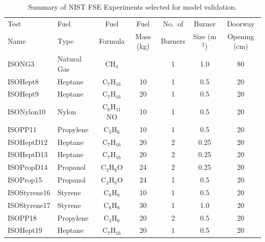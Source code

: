 \begin{table}[!ht]
\centering
\caption[Summary of NIST FSE Experiments selected for model validation]{Summary of NIST FSE Experiments selected for model validation.}
\begin{tabular}{|l|l|c|c|c|c|c|}
\hline
Test          &  Fuel         &  Fuel             &  Fuel      &  No.~of   &  Burner       &  Doorway          \\
Name          &  Type         &  Formula          &  Mass (kg) &  Burners  &  Size (m$^2$) &  Opening (cm)     \\ \hline \hline
ISONG3        &  Natural Gas  &  CH$_4$           &            &  1        &  1.0          &  80               \\ \hline
ISOHept8      &  Heptane      &  C$_7$H$_{16}$    &  10        &  1        &  0.5          &  20               \\ \hline
ISOHept9      &  Heptane      &  C$_7$H$_{16}$    &  20        &  1        &  0.5          &  20               \\ \hline
ISONylon10    &  Nylon        &  C$_6$H$_{11}$NO  &  10        &  1        &  0.5          &  20               \\ \hline
ISOPP11       &  Propylene    &  C$_3$H$_6$       &  10        &  1        &  0.5          &  20               \\ \hline
ISOHeptD12    &  Heptane      &  C$_7$H$_{16}$    &  20        &  2        &  0.25         &  20               \\ \hline
ISOHeptD13    &  Heptane      &  C$_7$H$_{16}$    &  20        &  2        &  0.25         &  20               \\ \hline
ISOPropD14    &  Propanol     &  C$_3$H$_8$O      &  24        &  2        &  0.25         &  20               \\ \hline
ISOProp15     &  Propanol     &  C$_3$H$_8$O      &  24        &  1        &  0.5          &  20               \\ \hline
ISOStyrene16  &  Styrene      &  C$_8$H$_8$       &  10        &  1        &  0.5          &  20               \\ \hline
ISOStyrene17  &  Styrene      &  C$_8$H$_8$       &  30        &  1        &  1.0          &  20               \\ \hline
ISOPP18       &  Propylene    &  C$_3$H$_6$       &  20        &  2        &  0.5          &  20               \\ \hline
ISOHept19     &  Heptane      &  C$_7$H$_{16}$    &  20        &  1        &  0.5          &  20               \\ \hline

\end{tabular}
\end{table}
